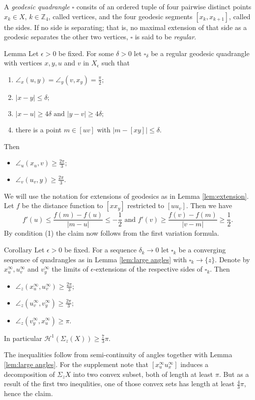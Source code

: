 \documentclass[a4paper,10pt]{amsart}
\begin{document}
A {\em geodesic quadrangle} $\square$ consits of an ordered tuple of four pairwise 
distinct points $x_k\in X$, $k\in\mathbb{Z}_4$, 
called vertices, and the four geodesic segments $[x_k,x_{k+1}]$, called the sides. 
If no side is separating; that is, no maximal extension of that side as a geodesic 
separates the other two vertices, $\square$ is said to be {\em regular}.

\begin{thm}{Lemma}\label{lem:large angles}
Let $\epsilon>0$ be fixed. For some $\delta>0$ let $\square_\delta$ be a regular geodesic quadrangle with
vertices $x,y,u$ and $v$ in $X_\epsilon$ such that
\begin{enumerate}
	\item $\angle_x(u,y)=\angle_y(v,x_y)=\frac{\pi}{2};$
	\item $|x-y|\leq\delta;$
	\item $|x-u|\geq 4\delta\text{ and }|y-v|\geq 4\delta;$
	\item there is a point $m\in [uv]$ with $|m-[xy]|\leq \delta.$
\end{enumerate}
Then 
\begin{itemize}
\item $\angle_u(x_u,v)\geq\frac{2\pi}{3};$
\item $\angle_v(u_v,y)\geq\frac{2\pi}{3}.$
\end{itemize}
\end{thm}

We will use the notation for extensions of geodesics as in Lemma \ref{lem:extension}.
Let $f$ be the distance function to $[x x_y]$ restricted to $[u u_v]$. Then we have
$$
f'(u)\leq\frac{f(m)-f(u)}{|m-u|}\leq-\frac{1}{2}\text{  and  }f'(v)\geq\frac{f(v)-f(m)}{|v-m|}\geq\frac{1}{2}.
$$
By condition (1) the claim now follows from the first variation formula.
\qeds

\begin{thm}{Corollary}
Let $\epsilon>0$ be fixed. For a sequence $\delta_k\to 0$ let $\square_k$ be a converging sequence of quadrangles
as in Lemma \ref{lem:large angles} with $\square_k\to \{z\}$. Denote by $x^\infty_u, u^\infty_v$ and $v^\infty_y$
the limits of $\epsilon$-extensions of the respective sides of $\square_k$. Then
\begin{itemize}
\item $\angle_z(x^\infty_u,u^\infty_v)\geq\frac{2\pi}{3};$
\item $\angle_z(u^\infty_v,v^\infty_y)\geq\frac{2\pi}{3};$
\item $\angle_z(v^\infty_y,x^\infty_u)\geq\pi.$
\end{itemize}
In particular $\mathcal{H}^1(\Sigma_z(X))\geq\frac{7}{3}\pi$.
\end{thm}
The inequalities follow from semi-continuity of angles together with Lemma \ref{lem:large angles}.
For the supplement note that $[x^\infty_u u^\infty_x]$ induces a decomposition of $\Sigma_z X$ into two convex subset, both of length at least $\pi$.
But as a result of the first two inequlities, one of those convex sets has length at least $\frac{4}{3}\pi$, hence the claim.
\qeds
\end{document}
